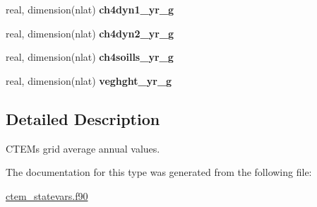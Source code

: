 \begin{DoxyCompactItemize}
\item 
\hypertarget{structctem__statevars_1_1ctem__gridavg__annual_a69697042dee989c18a02ac0b14fee186}{}real, dimension(nlat) {\bfseries ch4dyn1\+\_\+yr\+\_\+g}\label{structctem__statevars_1_1ctem__gridavg__annual_a69697042dee989c18a02ac0b14fee186}

\item 
\hypertarget{structctem__statevars_1_1ctem__gridavg__annual_aa2ac58833bdb7d9d9238161553e8cf07}{}real, dimension(nlat) {\bfseries ch4dyn2\+\_\+yr\+\_\+g}\label{structctem__statevars_1_1ctem__gridavg__annual_aa2ac58833bdb7d9d9238161553e8cf07}

\item 
\hypertarget{structctem__statevars_1_1ctem__gridavg__annual_a33b989a9f77e16ec0619b6e9c90eee7d}{}real, dimension(nlat) {\bfseries ch4soills\+\_\+yr\+\_\+g}\label{structctem__statevars_1_1ctem__gridavg__annual_a33b989a9f77e16ec0619b6e9c90eee7d}

\item 
\hypertarget{structctem__statevars_1_1ctem__gridavg__annual_a19c4180421b5b226f732ed93d96d29c5}{}real, dimension(nlat) {\bfseries veghght\+\_\+yr\+\_\+g}\label{structctem__statevars_1_1ctem__gridavg__annual_a19c4180421b5b226f732ed93d96d29c5}

\end{DoxyCompactItemize}


\subsection{Detailed Description}
C\+T\+E\+M\textquotesingle{}s grid average annual values. 

The documentation for this type was generated from the following file\+:\begin{DoxyCompactItemize}
\item 
\hyperlink{ctem__statevars_8f90}{ctem\+\_\+statevars.\+f90}\end{DoxyCompactItemize}
